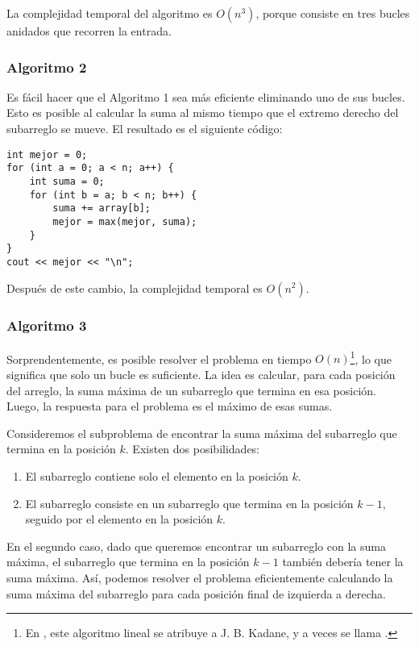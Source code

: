 La complejidad temporal del algoritmo es $O(n^3)$,
porque consiste en tres bucles anidados
que recorren la entrada.

\subsubsection{Algoritmo 2}

Es fácil hacer que el Algoritmo 1 sea más eficiente
eliminando uno de sus bucles.
Esto es posible al calcular la suma al mismo tiempo
que el extremo derecho del subarreglo se mueve.
El resultado es el siguiente código:

\begin{lstlisting}
int mejor = 0;
for (int a = 0; a < n; a++) {
    int suma = 0;
    for (int b = a; b < n; b++) {
        suma += array[b];
        mejor = max(mejor, suma);
    }
}
cout << mejor << "\n";
\end{lstlisting}
Después de este cambio, la complejidad temporal es $O(n^2)$.

\subsubsection{Algoritmo 3}

Sorprendentemente, es posible resolver el problema
en tiempo $O(n)$\footnote{En \cite{ben86}, este algoritmo lineal
se atribuye a J. B. Kadane, y a veces se
llama  .}, lo que significa
que solo un bucle es suficiente.
La idea es calcular, para cada posición del arreglo,
la suma máxima de un subarreglo que termina en esa posición.
Luego, la respuesta para el problema es el
máximo de esas sumas.

Consideremos el subproblema de encontrar la suma máxima del subarreglo
que termina en la posición $k$.
Existen dos posibilidades:
\begin{enumerate}
\item El subarreglo contiene solo el elemento en la posición $k$.
\item El subarreglo consiste en un subarreglo que termina
en la posición $k-1$, seguido por el elemento en la posición $k$.
\end{enumerate}

En el segundo caso, dado que queremos
encontrar un subarreglo con la suma máxima,
el subarreglo que termina en la posición $k-1$
también debería tener la suma máxima.
Así, podemos resolver el problema eficientemente
calculando la suma máxima del subarreglo
para cada posición final de izquierda a derecha.

